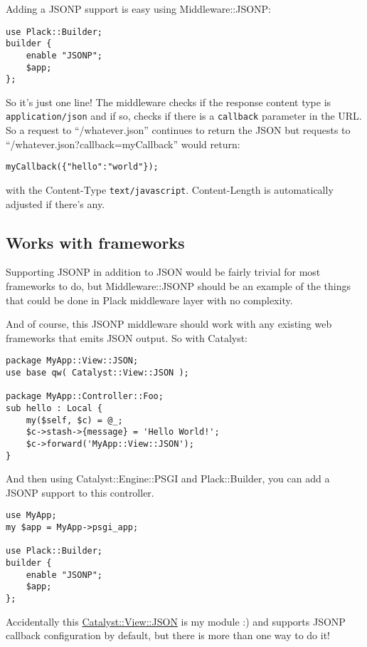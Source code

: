 Adding a JSONP support is easy using Middleware::JSONP:

\begin{lstlisting}
use Plack::Builder;
builder {
    enable "JSONP";
    $app;
};
\end{lstlisting}

So it's just one line! The middleware checks if the response content
type is \lstinline!application/json! and if so, checks if there is a
\lstinline!callback! parameter in the URL. So a request to
``/whatever.json'' continues to return the JSON but requests to
``/whatever.json?callback=myCallback'' would return:

\begin{lstlisting}
myCallback({"hello":"world"});
\end{lstlisting}

with the Content-Type \lstinline!text/javascript!. Content-Length is
automatically adjusted if there's any.

\subsection{Works with frameworks}\label{works-with-frameworks}

Supporting JSONP in addition to JSON would be fairly trivial for most
frameworks to do, but Middleware::JSONP should be an example of the
things that could be done in Plack middleware layer with no complexity.

And of course, this JSONP middleware should work with any existing web
frameworks that emits JSON output. So with Catalyst:

\begin{lstlisting}
package MyApp::View::JSON;
use base qw( Catalyst::View::JSON );

package MyApp::Controller::Foo;
sub hello : Local {
    my($self, $c) = @_;
    $c->stash->{message} = 'Hello World!';
    $c->forward('MyApp::View::JSON');
}
\end{lstlisting}

And then using Catalyst::Engine::PSGI and Plack::Builder, you can add a
JSONP support to this controller.

\begin{lstlisting}
use MyApp;
my $app = MyApp->psgi_app;

use Plack::Builder;
builder {
    enable "JSONP";
    $app;
};
\end{lstlisting}

Accidentally this
\href{http://search.cpan.org/perldoc?Catalyst::View::JSON}{Catalyst::View::JSON}
is my module :) and supports JSONP callback configuration by default,
but there is more than one way to do it!

